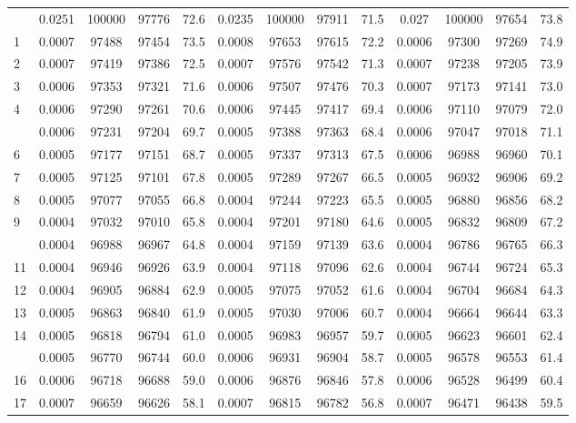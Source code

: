 \documentclass[
  14pt,
]{article}
\begin{document}
\begin{longtable}[t]{lcccccccccccc}
\endfoot
\bottomrule
\endlastfoot
0 & 0.0251 & 100000 & 97776 & 72.6 & 0.0235 & 100000 & 97911 & 71.5 & 0.027 & 100000 & 97654 & 73.8\\
1 & 0.0007 & 97488 & 97454 & 73.5 & 0.0008 & 97653 & 97615 & 72.2 & 0.0006 & 97300 & 97269 & 74.9\\
2 & 0.0007 & 97419 & 97386 & 72.5 & 0.0007 & 97576 & 97542 & 71.3 & 0.0007 & 97238 & 97205 & 73.9\\
3 & 0.0006 & 97353 & 97321 & 71.6 & 0.0006 & 97507 & 97476 & 70.3 & 0.0007 & 97173 & 97141 & 73.0\\
4 & 0.0006 & 97290 & 97261 & 70.6 & 0.0006 & 97445 & 97417 & 69.4 & 0.0006 & 97110 & 97079 & 72.0\\
\addlinespace
5 & 0.0006 & 97231 & 97204 & 69.7 & 0.0005 & 97388 & 97363 & 68.4 & 0.0006 & 97047 & 97018 & 71.1\\
6 & 0.0005 & 97177 & 97151 & 68.7 & 0.0005 & 97337 & 97313 & 67.5 & 0.0006 & 96988 & 96960 & 70.1\\
7 & 0.0005 & 97125 & 97101 & 67.8 & 0.0005 & 97289 & 97267 & 66.5 & 0.0005 & 96932 & 96906 & 69.2\\
8 & 0.0005 & 97077 & 97055 & 66.8 & 0.0004 & 97244 & 97223 & 65.5 & 0.0005 & 96880 & 96856 & 68.2\\
9 & 0.0004 & 97032 & 97010 & 65.8 & 0.0004 & 97201 & 97180 & 64.6 & 0.0005 & 96832 & 96809 & 67.2\\
\addlinespace
10 & 0.0004 & 96988 & 96967 & 64.8 & 0.0004 & 97159 & 97139 & 63.6 & 0.0004 & 96786 & 96765 & 66.3\\
11 & 0.0004 & 96946 & 96926 & 63.9 & 0.0004 & 97118 & 97096 & 62.6 & 0.0004 & 96744 & 96724 & 65.3\\
12 & 0.0004 & 96905 & 96884 & 62.9 & 0.0005 & 97075 & 97052 & 61.6 & 0.0004 & 96704 & 96684 & 64.3\\
13 & 0.0005 & 96863 & 96840 & 61.9 & 0.0005 & 97030 & 97006 & 60.7 & 0.0004 & 96664 & 96644 & 63.3\\
14 & 0.0005 & 96818 & 96794 & 61.0 & 0.0005 & 96983 & 96957 & 59.7 & 0.0005 & 96623 & 96601 & 62.4\\
\addlinespace
15 & 0.0005 & 96770 & 96744 & 60.0 & 0.0006 & 96931 & 96904 & 58.7 & 0.0005 & 96578 & 96553 & 61.4\\
16 & 0.0006 & 96718 & 96688 & 59.0 & 0.0006 & 96876 & 96846 & 57.8 & 0.0006 & 96528 & 96499 & 60.4\\
17 & 0.0007 & 96659 & 96626 & 58.1 & 0.0007 & 96815 & 96782 & 56.8 & 0.0007 & 96471 & 96438 & 59.5\\

\end{longtable}
\end{document}
